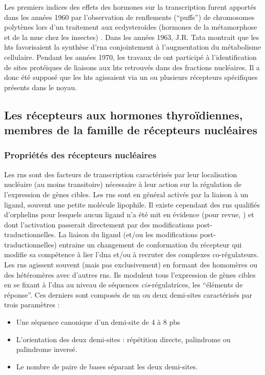 \documentclass[../main.tex]{subfiles}
\begin{document}
	Les premiers indices des effets des hormones sur la transcription furent apportés dans les années 1960 par l'observation de renflements (``puffs'') de chromosomes polytènes lors d'un traitement aux ecdysteroïdes (hormones de la métamorphose et de la mue chez les insectes) \citep{Clever1960}.
	Dans les années 1963, J.R. Tata montrait que les \glspl{ht} favorisaient la synthèse d'\gls{rna} conjointement à l'augmentation du métabolisme cellulaire.
	Pendant les années 1970, les travaux de \citet{Samuels1973} ont participé à l'identification de sites protéiques de liaisons aux \glspl{ht} retrouvés dans des fractions nucléaires. Il a donc été supposé que les \glspl{ht} agissaient via un ou plusieurs récepteurs spécifiques présents dans le noyau.


	\subsection{Les récepteurs aux hormones thyroïdiennes, membres de la famille de récepteurs nucléaires}\label{subsubsec:TR}

		\subsubsection{Propriétés des récepteurs nucléaires}
			Les \glspl{rn} sont des facteurs de transcription caractérisés par leur localisation nucléaire (au moins transitoire) nécessaire à leur action sur la régulation de l'expression de gènes cibles.
			Les \glspl{rn} sont en général activés par la liaison à un ligand, souvent une petite molécule lipophile.
			Il existe cependant des \glspl{rn} qualifiés d'orphelins pour lesquels aucun ligand n'a été mit en évidence (pour revue, \citealp{Giguere1999}) et dont l'activation passerait directement par des modifications post-traductionnelles.
			La liaison du ligand (et/ou les modifications post-traductionnelles) entraine un changement de conformation du récepteur qui modifie sa compétence à lier l'\gls{dna} et/ou à recruter des complexes co-régulateurs.
			Les \glspl{rn} agissent souvent (mais pas exclusivement) en formant des homomères ou des hétéromères avec d'autres \glspl{rn}.
			Ils modulent tous l'expression de gènes cibles en se fixant à l'\gls{dna} au niveau de séquences \textit{cis}-régulatrices, les ``éléments de réponse''.
			Ces derniers sont composés de un ou deux demi-sites caractérisés par trois paramètres :
			\begin{itemize}
				\item Une séquence canonique d'un demi-site de 4 à 8 \glspl{pb}
				\item L'orientation des deux demi-sites : répétition directe, palindrome ou palindrome inversé.
				\item Le nombre de paire de bases séparant les deux demi-sites.
			\end{itemize}
\end{document}
